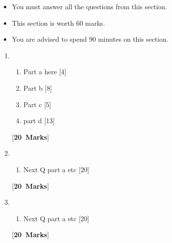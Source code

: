 \documentclass[12pt]{article}
\newenvironment{sectionrubric}{\begin{itemize}\itemsep 0em \bf}{\end{itemize}}
\newcommand{\pts}[1]{\hspace*{0.1cm}\hfill[#1]}
\newcommand{\ptsmk}[1]{\phantom{.}\hfill[\textbf{#1~Marks}]}
\begin{document}
	\begin{sectionrubric}
	\item You must answer all the questions from this section.
	\item This section is worth 60 marks.
	\item You are advised to spend 90 minutes on this section.
	\end{sectionrubric}
	\renewcommand{\theenumi}{B\arabic{enumi}}
	\begin{enumerate}
		
		
		\item 
		\begin{enumerate}
			
			\item
			
			Part a here
			\pts{4}
			
			
			\item
			
			Part b
			\pts{8}
			
			\item
			Part c
			\pts{5}
			
			
			
			
			\item 
			part d
			\pts{13}
			
		\end{enumerate}
		\ptsmk{20}
		
		\newpage
		
		\item
		\begin{enumerate}
			
			\item
			
			Next Q part a etc
			\pts{20}
		\end{enumerate}
		\ptsmk{20}
		\newpage
		
		\item
		\begin{enumerate}
			
			\item
			
			Next Q part a etc
			\pts{20}
		\end{enumerate}
		\ptsmk{20}
		
		
	\end{enumerate}
	
	
	
	
\end{document}
